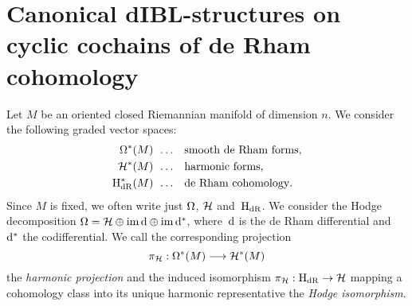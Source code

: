 \documentclass[\MainFolder/Text.tex]{subfiles}
\begin{document}
	
\section{Canonical dIBL-structures on cyclic cochains of de Rham cohomology} \label{Sec:Manifold1}
\allowdisplaybreaks
Let $M$ be an oriented closed Riemannian manifold of dimension $n$.
We consider the following graded vector spaces:
$$\begin{aligned}
\Omega^*(M) &\;\,\dots && \text{smooth de Rham forms}, \\
\mathcal{H}^*(M) &\;\,\dots &&\text{harmonic forms}, \\
\mathrm{H}_{\mathrm{dR}}^*(M) &\;\,\dots && \text{de Rham cohomology}.
\end{aligned}$$
Since $M$ is fixed, we often write just $\Omega$, $\mathcal{H}$ and~$\mathrm{H}_{\mathrm{dR}}$.
We consider the Hodge decomposition $\Omega=\mathcal{H}\oplus\operatorname{im}\mathrm{d}\oplus\operatorname{im}\mathrm{d}^*$, where~$\mathrm{d}$ is the de Rham differential and~$\mathrm{d}^*$ the codifferential.
We call the corresponding projection
\begin{equation}\label{Eq:HarmProj}
\pi_{\mathcal{H}}: \Omega^*(M) \longrightarrow \mathcal{H}^*(M) 
\end{equation}
the \emph{harmonic projection} and the induced isomorphism $\pi_{\mathcal{H}}: \mathrm{H}_{\mathrm{dR}} \rightarrow \mathcal{H}$ mapping a cohomology class into its unique harmonic representative the \emph{Hodge isomorphism}.
\end{document}
